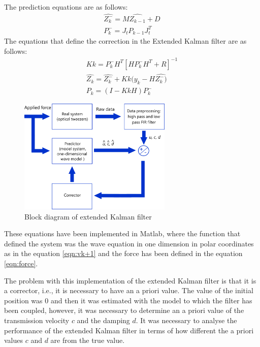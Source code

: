 \documentclass[12pt, a4paper]{article} %
\begin{document}
	The prediction equations are as follows:
	\setlength{\parskip}{4mm}
	\begin{equation} \label{eqn:predictor}
		\begin{array}{ l }
			
			\hat{Z_{k}^{-}} = M\hat{Z_{k-1}} + D \\
			P_{k}^{-} = J_{t}P_{k-1}J_{t}^{T}
			
		\end{array}
	\end{equation}
	The equations that define the correction in the Extended Kalman filter are as follows:
	\begin{equation} \label{eqn:corrector}
		\begin{array}{ l }
			
			Kk = P_{k}^{-}H^{T}[HP_{k}^{-}H^{T} + R]^{-1} \\
			\hat{Z_{k}} = \hat{Z_{k}^{-}} + Kk(y_{k}-H\hat{Z_{k}^{-})} \\
			P_{k} = (I - KkH)P_{k}^{-}
			
		\end{array}
	\end{equation}
	\begin{figure}[h!]
		\centering
		\includegraphics[width=0.65\textwidth]{figures/esquema_extended_kalman_filter.png}
		\caption{Block diagram of extended Kalman filter}
		\label{fig:kalman_esq}
	\end{figure}
	
	\newpage
	
	These equations have been implemented in Matlab, where the function that defined the system was the wave equation in one dimension in polar coordinates as in the equation \ref{eqn:vk+1} and the force has been defined in the equation \ref{eqn:force}. 
	
	The problem with this implementation of the extended Kalman filter is that it is a corrector, i.e., it is necessary to have an a priori value. The value of the initial position was 0 and then it was estimated with the model to which the filter has been coupled, however, it was necessary to determine an a priori value of the transmission velocity $c$ and the damping $d$. It was necessary to analyse the performance of the extended Kalman filter in terms of how different the a priori values $c$ and $d$ are from the true value.
	
\end{document}
